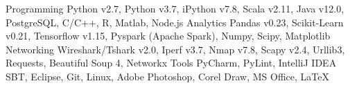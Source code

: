 

\begin{cvskills}

  \cvskill
    {Programming} %
    {Python v2.7, Python v3.7, iPython v7.8, Scala v2.11, Java v12.0, PostgreSQL, C/C++, R, Matlab, Node.js} %
  \cvskill
    {Analytics} %
    {Pandas v0.23, Scikit-Learn v0.21, Tensorflow v1.15, Pyspark (Apache Spark), Numpy, Scipy, Matplotlib} %
  \cvskill
    {Networking} %
    {Wireshark/Tshark v2.0, Iperf v3.7, Nmap v7.8, Scapy v2.4, Urllib3, Requests, Beautiful Soup 4, Networkx} %
  \cvskill
    {Tools} %
    {PyCharm, PyLint, IntelliJ IDEA SBT, Eclipse, Git, Linux, Adobe Photoshop, Corel Draw, MS Office, \LaTeX}
    

\end{cvskills}


